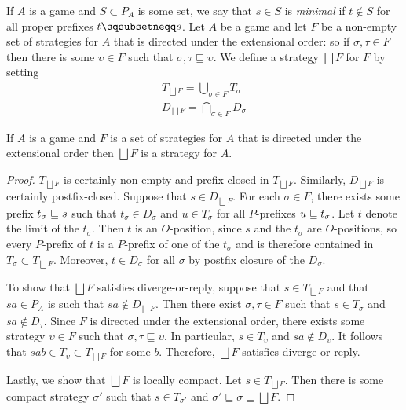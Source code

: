 \documentclass{entcs} \usepackage{prentcsmacro}
\newcommand{\exle}{\sqsubseteq}
\newcommand{\exlub}{\bigsqcup}
\newcommand{\0}{{\mathtt{0}}}
\begin{document}
If $A$ is a game and $S\subset P_A$ is some set, we say that $s\in S$ is \emph{minimal} if $t\not\in S$ for all proper prefixes $t\pprefix s$.  Let $A$ be a game and let $F$ be a non-empty set of strategies for $A$ that is directed under the extensional order: so if $\sigma,\tau\in F$ then there is some $\upsilon\in F$ such that $\sigma,\tau\exle\upsilon$.  We define a strategy $\exlub F$ for $F$ by setting
\begin{gather*}
  T_{\exlub F} = \bigcup_{\sigma\in F}T_\sigma \\
  D_{\exlub F} = \bigcap_{\sigma\in F}D_\sigma
\end{gather*}

\begin{proposition}
  If $A$ is a game and $F$ is a set of strategies for $A$ that is directed under the extensional order then $\exlub F$ is a strategy for $A$.
\end{proposition}
  \begin{proof}
    $T_{\exlub F}$ is certainly non-empty and prefix-closed in $T_{\exlub F}$.  Similarly, $D_{\exlub F}$ is certainly postfix-closed.  Suppose that $s\in D_{\exlub F}$.  For each $\sigma\in F$, there exists some prefix $t_\sigma\sqsubseteq s$ such that $t_\sigma\in D_\sigma$ and $u\in T_\sigma$ for all $P$-prefixes $u\sqsubseteq t_\sigma$.  Let $t$ denote the limit of the $t_\sigma$.  Then $t$ is an $O$-position, since $s$ and the $t_\sigma$ are $O$-positions, so every $P$-prefix of $t$ is a $P$-prefix of one of the $t_\sigma$ and is therefore contained in $T_\sigma\subset T_{\exlub F}$.  Moreover, $t\in D_\sigma$ for all $\sigma$ by postfix closure of the $D_\sigma$.  

    To show that $\exlub F$ satisfies diverge-or-reply, suppose that $s\in T_{\exlub F}$ and that $sa\in P_A$ is such that $sa\not\in D_{\exlub F}$.  Then there exist $\sigma,\tau\in F$ such that $s\in T_\sigma$ and $sa\not\in D_\tau$.  Since $F$ is directed under the extensional order, there exists some strategy $\upsilon\in F$ such that $\sigma,\tau\exle\upsilon$.  In particular, $s\in T_\upsilon$ and $sa\not\in D_\upsilon$.  It follows that $sab\in T_\upsilon\subset T_{\exlub F}$ for some $b$.  Therefore, $\exlub F$ satisfies diverge-or-reply.

    Lastly, we show that $\exlub F$ is locally compact.  Let $s\in T_{\exlub F}$.  Then there is some compact strategy $\sigma'$ such that $s\in T_{\sigma'}$ and $\sigma'\exle\sigma\exle\exlub F$.  
  \end{proof}
\end{document}
